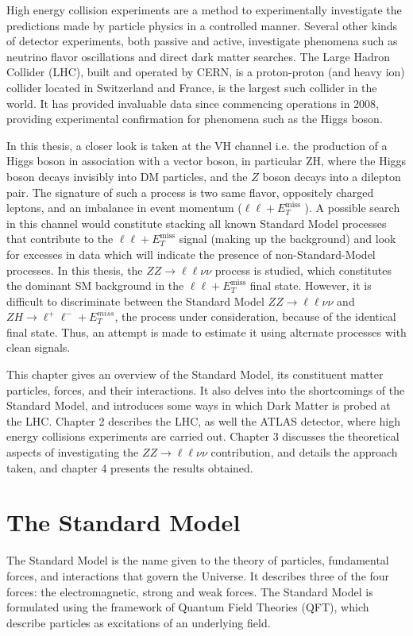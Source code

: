 \documentclass[11pt,a4paper,openright,twoside]{report}
\newcommand{\ZZ}{$ZZ\to \ell\ell\nu\nu$ }
\newcommand{\llM}{$\ell\ell+E_T^{\mathrm{miss}}$ }
\begin{document}
High energy collision experiments are a method to experimentally investigate the predictions made by particle physics in a controlled manner. Several other kinds of detector experiments, both passive and active, investigate phenomena such as neutrino flavor oscillations and direct dark matter searches. The Large Hadron Collider (LHC), built and operated by CERN, is a proton-proton (and heavy ion) collider located in Switzerland and France, is the largest such collider in the world. It has provided invaluable data since commencing operations in 2008, providing experimental confirmation for phenomena such as the Higgs boson.

In this thesis, a closer look is taken at the VH channel i.e. the production of a Higgs boson in association with a vector boson, in particular ZH, where the Higgs boson decays invisibly into DM particles, and the $Z$ boson decays into a dilepton pair. The signature of such a process is two same flavor, oppositely charged leptons, and an imbalance in event momentum (\llM). A possible search in this channel would constitute stacking all known Standard Model processes that contribute to the \llM signal (making up the background) and look for excesses in data which will indicate the presence of non-Standard-Model processes. In this thesis, the \ZZ process is studied, which constitutes the dominant SM background in the \llM final state. However, it is difficult to discriminate between the Standard Model \ZZ and $ZH\to \ell^+\ell^-+E_T^{miss}$, the process under consideration, because of the identical final state. Thus, an attempt is made to estimate it using alternate processes with clean signals. 

This chapter gives an overview of the Standard Model, its constituent matter particles, forces, and their interactions. It also delves into the shortcomings of the Standard Model, and introduces some ways in which Dark Matter is probed at the LHC. Chapter 2 describes the LHC, as well the ATLAS detector, where high energy collisions experiments are carried out. Chapter 3 discusses the theoretical aspects of investigating the \ZZ contribution, and details the approach taken, and chapter 4 presents the results obtained.

\section{The Standard Model}
The Standard Model is the name given to the theory of particles, fundamental forces, and interactions that govern the Universe. It describes three of the four forces: the electromagnetic, strong and weak forces. The Standard Model is formulated using the framework of Quantum Field Theories (QFT), which describe particles as excitations of an underlying field.
\end{document}
